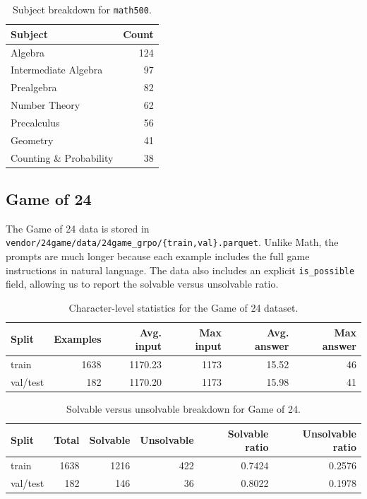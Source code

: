 \begin{table}[h]
\centering
\begin{tabular}{lr}
\hline
Subject & Count \\
\hline
Algebra & 124 \\
Intermediate Algebra & 97 \\
Prealgebra & 82 \\
Number Theory & 62 \\
Precalculus & 56 \\
Geometry & 41 \\
Counting \& Probability & 38 \\
\hline
\end{tabular}
\caption{Subject breakdown for \texttt{math500}.}
\end{table}

\subsection{Game of 24}

The Game of 24 data is stored in \texttt{vendor/24game/data/24game\_grpo/\{train,val\}.parquet}. Unlike Math, the prompts are much longer because each example includes the full game instructions in natural language. The data also includes an explicit \texttt{is\_possible} field, allowing us to report the solvable versus unsolvable ratio.

\begin{table}[h]
\centering
\begin{tabular}{lrrrrr}
\hline
Split & Examples & Avg. input & Max input & Avg. answer & Max answer \\
\hline
train & 1638 & 1170.23 & 1173 & 15.52 & 46 \\
val/test & 182 & 1170.20 & 1173 & 15.98 & 41 \\
\hline
\end{tabular}
\caption{Character-level statistics for the Game of 24 dataset.}
\end{table}

\begin{table}[h]
\centering
\begin{tabular}{lrrrrr}
\hline
Split & Total & Solvable & Unsolvable & Solvable ratio & Unsolvable ratio \\
\hline
train & 1638 & 1216 & 422 & 0.7424 & 0.2576 \\
val/test & 182 & 146 & 36 & 0.8022 & 0.1978 \\
\hline
\end{tabular}
\caption{Solvable versus unsolvable breakdown for Game of 24.}
\end{table}

